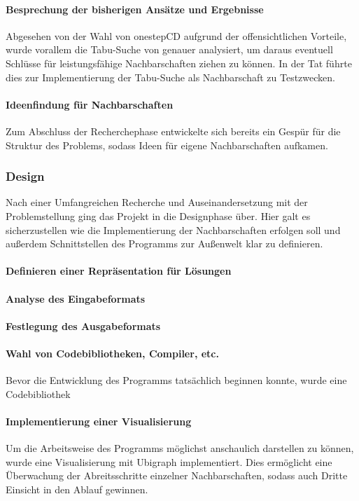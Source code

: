 \paragraph{Besprechung der bisherigen Ansätze und Ergebnisse}{Abgesehen von der Wahl von onestepCD aufgrund der offensichtlichen Vorteile, wurde vorallem die Tabu-Suche von genauer analysiert, um daraus eventuell Schlüsse für leistungsfähige Nachbarschaften ziehen zu können. In der Tat führte dies zur Implementierung der Tabu-Suche als Nachbarschaft zu Testzwecken.} %

\paragraph{Ideenfindung für Nachbarschaften}{Zum Abschluss der Recherchephase entwickelte sich bereits ein Gespür für die Struktur des Problems, sodass Ideen für eigene Nachbarschaften aufkamen.} %

\subsubsection{Design}

Nach einer Umfangreichen Recherche und Auseinandersetzung mit der Problemstellung ging das Projekt in die Designphase über. Hier galt es sicherzustellen wie die Implementierung der Nachbarschaften erfolgen soll und außerdem Schnittstellen des Programms zur Außenwelt klar zu definieren.

\paragraph{Definieren einer Repräsentation für Lösungen}{}
\paragraph{Analyse des Eingabeformats}{}
\paragraph{Festlegung des Ausgabeformats}{}
\paragraph{Wahl von Codebibliotheken, Compiler, etc.}{Bevor die Entwicklung des Programms tatsächlich beginnen konnte, wurde eine Codebibliothek}
\paragraph{Implementierung einer Visualisierung}{Um die Arbeitsweise des Programms möglichst anschaulich darstellen zu können, wurde eine Visualisierung mit Ubigraph implementiert. Dies ermöglicht eine Überwachung der Abreitsschritte einzelner Nachbarschaften, sodass auch Dritte Einsicht in den Ablauf gewinnen.}

